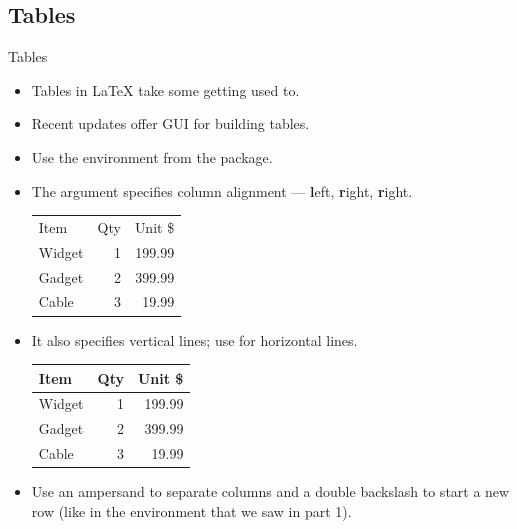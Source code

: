 \documentclass{beamer}
\begin{document}
\subsection{Tables}
\begin{frame}[fragile]{Tables}
\begin{itemize}
\item Tables in \LaTeX{} take some getting used to. 
\item Recent updates offer GUI for building tables.
\item Use the  environment from the  package.
\item The argument specifies column alignment --- \textbf{l}eft, \textbf{r}ight, \textbf{r}ight.
\begin{exampletwouptiny}
\begin{tabular}{lrr}
Item   & Qty & Unit \$ \\
Widget & 1   & 199.99  \\
Gadget & 2   & 399.99  \\
Cable  & 3   & 19.99   \\
\end{tabular}
\end{exampletwouptiny}
\item It also specifies vertical lines; use  for horizontal lines.
\begin{exampletwouptiny}
\begin{tabular}{|l|r|r|} \hline
Item   & Qty & Unit \$ \\\hline
Widget & 1   & 199.99  \\
Gadget & 2   & 399.99  \\
Cable  & 3   & 19.99   \\\hline
\end{tabular}
\end{exampletwouptiny}
\item Use an ampersand \keystrokebftt{\&} to separate columns and a double backslash \keystrokebftt{\bs}\keystrokebftt{\bs} to start a new row (like in the  environment that we saw in part 1).
\end{itemize}
\end{frame}


\end{document}
